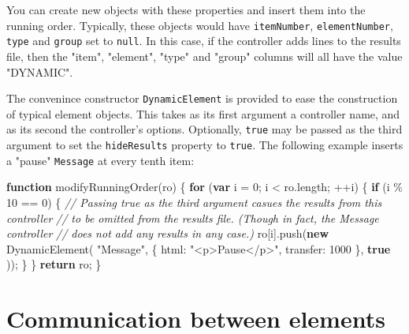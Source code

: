\documentclass[
]{article}
\newenvironment{Shaded}{}{}
\newcommand{\AttributeTok}[1]{\textcolor[rgb]{0.49,0.56,0.16}{#1}}
\newcommand{\CommentTok}[1]{\textcolor[rgb]{0.38,0.63,0.69}{\textit{#1}}}
\newcommand{\ControlFlowTok}[1]{\textcolor[rgb]{0.00,0.44,0.13}{\textbf{#1}}}
\newcommand{\DataTypeTok}[1]{\textcolor[rgb]{0.56,0.13,0.00}{#1}}
\newcommand{\DecValTok}[1]{\textcolor[rgb]{0.25,0.63,0.44}{#1}}
\newcommand{\FunctionTok}[1]{\textcolor[rgb]{0.02,0.16,0.49}{#1}}
\newcommand{\KeywordTok}[1]{\textcolor[rgb]{0.00,0.44,0.13}{\textbf{#1}}}
\newcommand{\NormalTok}[1]{#1}
\newcommand{\OperatorTok}[1]{\textcolor[rgb]{0.40,0.40,0.40}{#1}}
\newcommand{\StringTok}[1]{\textcolor[rgb]{0.25,0.44,0.63}{#1}}
\begin{document}
You can create new objects with these properties and insert them into
the running order. Typically, these objects would have
\texttt{itemNumber}, \texttt{elementNumber}, \texttt{type} and
\texttt{group} set to \texttt{null}. In this case, if the controller
adds lines to the results file, then the "item", "element", "type" and
"group" columns will all have the value "DYNAMIC".

The convenince constructor \texttt{DynamicElement} is provided to ease
the construction of typical element objects. This takes as its first
argument a controller name, and as its second the controller's options.
Optionally, \texttt{true} may be passed as the third argument to set the
\texttt{hideResults} property to \texttt{true}. The following example
inserts a "pause" \texttt{Message} at every tenth item:

\begin{Shaded}
\begin{Highlighting}[]
    \KeywordTok{function} \FunctionTok{modifyRunningOrder}\NormalTok{(ro) \{}
        \ControlFlowTok{for}\NormalTok{ (}\KeywordTok{var}\NormalTok{ i }\OperatorTok{=} \DecValTok{0}\OperatorTok{;}\NormalTok{ i }\OperatorTok{\textless{}}\NormalTok{ ro}\OperatorTok{.}\AttributeTok{length}\OperatorTok{;} \OperatorTok{++}\NormalTok{i) \{}
            \ControlFlowTok{if}\NormalTok{ (i }\OperatorTok{\%} \DecValTok{10} \OperatorTok{==} \DecValTok{0}\NormalTok{) \{}
                \CommentTok{// Passing \textquotesingle{}true\textquotesingle{} as the third argument casues the results from this controller}
                \CommentTok{// to be omitted from the results file. (Though in fact, the Message controller}
                \CommentTok{// does not add any results in any case.)}
\NormalTok{                ro[i]}\OperatorTok{.}\FunctionTok{push}\NormalTok{(}\KeywordTok{new} \FunctionTok{DynamicElement}\NormalTok{(}
                    \StringTok{"Message"}\OperatorTok{,}
\NormalTok{                    \{ }\DataTypeTok{html}\OperatorTok{:} \StringTok{"\textless{}p\textgreater{}Pause\textless{}/p\textgreater{}"}\OperatorTok{,} \DataTypeTok{transfer}\OperatorTok{:} \DecValTok{1000}\NormalTok{ \}}\OperatorTok{,}
                    \KeywordTok{true}
\NormalTok{                ))}\OperatorTok{;}
\NormalTok{            \}}
\NormalTok{        \}}
        \ControlFlowTok{return}\NormalTok{ ro}\OperatorTok{;}
\NormalTok{    \}}
\end{Highlighting}
\end{Shaded}

\hypertarget{communication-between-elements}{%
\section{Communication between
elements}\label{communication-between-elements}}
\end{document}
